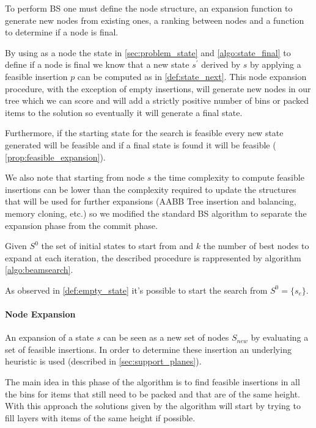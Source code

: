 To perform BS one must define the node structure, an expansion function to generate new nodes from existing ones, a ranking between nodes and a function to determine if a node is final.

By using as a node the state in \cref{sec:problem_state} and \cref{algo:state_final} to define if a node is final we know that a new state $s^\prime$ derived by $s$ by applying a feasible insertion $p$ can be computed as in \cref{def:state_next}.
This node expansion procedure, with the exception of empty insertions, will generate new nodes in our tree which we can score and will add a strictly positive number of bins or packed items to the solution so eventually it will generate a final state.

Furthermore, if the starting state for the search is feasible every new state generated will be feasible and if a final state is found it will be feasible ( \cref{prop:feasible_expansion}).

We also note that starting from node $s$ the time complexity to compute feasible insertions can be lower than the complexity required to update the structures that will be used for further expansions (AABB Tree insertion and balancing, memory cloning, etc.) so we modified the standard BS algorithm to separate the expansion phase from the commit phase.

Given $S^0$ the set of initial states to start from and $k$ the number of best nodes to expand at each iteration, the described procedure is rappresented by algorithm \ref{algo:beamsearch}.

As observed in \cref{def:empty_state} it's possible to start the search from $S^0 = \{ s_e \}$.



\paragraph*{Node Expansion}

An expansion of a state $s$ can be seen as a new set of nodes $S_{new}$ by evaluating a set of feasible insertions.
In order to determine these insertion an underlying heuristic is used (described in \cref{sec:support_planes}).

The main idea in this phase of the algorithm is to find feasible insertions in all the bins for items that still need to be packed and that are of the same height.
With this approach the solutions given by the algorithm will start by trying to fill layers with items of the same height if possible.

